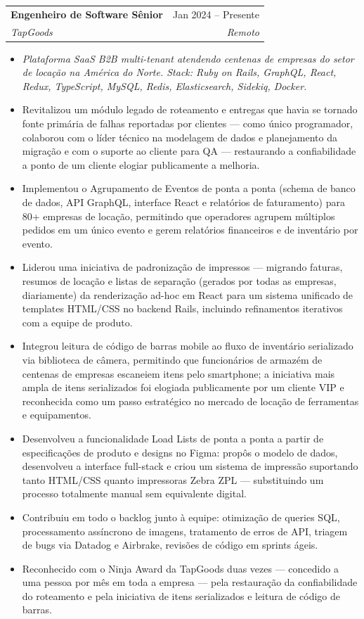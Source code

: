 \documentclass[letterpaper,11pt]{article}
\makeatletter
\newcommand{\resumeItem}[1]{
  \item\small{#1 \vspace{-2pt}}
}
\newcommand{\resumeSubheading}[4]{
  \vspace{-2pt}\item
    \begin{tabular*}{0.97\textwidth}[t]{l@{\extracolsep{\fill}}r}
      \textbf{#1} & #2 \\
      \textit{\small#3} & \textit{\small #4} \\
    \end{tabular*}\vspace{-7pt}
}
\newcommand{\resumeDescription}[1]{%
  \begin{itemize}[leftmargin=0.15in, label={}]
    \item\small{\textit{#1}}
  \end{itemize}\vspace{-10pt}
}
\newcommand{\resumeItemListStart}{\begin{itemize}}
\newcommand{\resumeItemListEnd}{\end{itemize}\vspace{-5pt}}
\makeatother
\begin{document}
  \resumeSubheading
    {Engenheiro de Software Sênior}{Jan 2024 -- Presente}
    {TapGoods}{Remoto}
  \resumeDescription{Plataforma SaaS B2B multi-tenant atendendo centenas de empresas do setor de locação na América do Norte. Stack: Ruby on Rails, GraphQL, React, Redux, TypeScript, MySQL, Redis, Elasticsearch, Sidekiq, Docker.}
  \resumeItemListStart
    \resumeItem{Revitalizou um módulo legado de roteamento e entregas que havia se tornado fonte primária de falhas reportadas por clientes --- como único programador, colaborou com o líder técnico na modelagem de dados e planejamento da migração e com o suporte ao cliente para QA --- restaurando a confiabilidade a ponto de um cliente elogiar publicamente a melhoria.}
    \resumeItem{Implementou o Agrupamento de Eventos de ponta a ponta (schema de banco de dados, API GraphQL, interface React e relatórios de faturamento) para 80+ empresas de locação, permitindo que operadores agrupem múltiplos pedidos em um único evento e gerem relatórios financeiros e de inventário por evento.}
    \resumeItem{Liderou uma iniciativa de padronização de impressos --- migrando faturas, resumos de locação e listas de separação (gerados por todas as empresas, diariamente) da renderização ad-hoc em React para um sistema unificado de templates HTML/CSS no backend Rails, incluindo refinamentos iterativos com a equipe de produto.}
    \resumeItem{Integrou leitura de código de barras mobile ao fluxo de inventário serializado via biblioteca de câmera, permitindo que funcionários de armazém de centenas de empresas escaneiem itens pelo smartphone; a iniciativa mais ampla de itens serializados foi elogiada publicamente por um cliente VIP e reconhecida como um passo estratégico no mercado de locação de ferramentas e equipamentos.}
    \resumeItem{Desenvolveu a funcionalidade Load Lists de ponta a ponta a partir de especificações de produto e designs no Figma: propôs o modelo de dados, desenvolveu a interface full-stack e criou um sistema de impressão suportando tanto HTML/CSS quanto impressoras Zebra ZPL --- substituindo um processo totalmente manual sem equivalente digital.}
    \resumeItem{Contribuiu em todo o backlog junto à equipe: otimização de queries SQL, processamento assíncrono de imagens, tratamento de erros de API, triagem de bugs via Datadog e Airbrake, revisões de código em sprints ágeis.}
    \resumeItem{Reconhecido com o Ninja Award da TapGoods duas vezes --- concedido a uma pessoa por mês em toda a empresa --- pela restauração da confiabilidade do roteamento e pela iniciativa de itens serializados e leitura de código de barras.}
  \resumeItemListEnd
\end{document}

